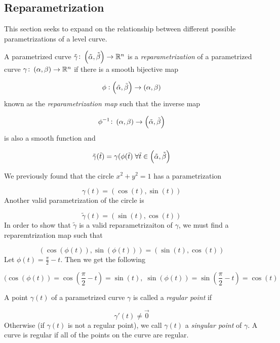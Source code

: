 \subsection{Reparametrization}
	This section seeks to expand on the relationship between different possible parametrizations of a level curve.


\begin{definition}
		A parametrized curve \(\tilde{\gamma} \colon \intoo{\tilde{\alpha}, \tilde{\beta}} \rightarrow \mathbb{R}^{n}\) is a \textit{reparametrization} of a parametrized curve \(\gamma \colon \intoo{\alpha, \beta} \rightarrow \mathbb{R}^{n}\) if there is a smooth bijective map

\[
\phi : \intoo{\tilde{\alpha}, \tilde{\beta}} \rightarrow \intoo{\alpha, \beta}
\]
		known as the \textit{reparametrization map} such that the inverse map

\[
\phi^{-1} \colon \intoo{\alpha, \beta} \rightarrow \intoo{\tilde{\alpha}, \tilde{\beta}}
\]
		is also a smooth function and

\[
\tilde{\gamma}(\tilde{t}) = \gamma(\phi(\tilde{t}) \; \forall \tilde{t} \in \intoo{\tilde{\alpha}, \tilde{\beta}}
\]

\end{definition}


\begin{example}
		We previously found that the circle \(x^{2} + y^{2} = 1\) has a parametrization

\[
\gamma(t) = (\cos(t), \sin(t))
\]
		Another valid parametrization of the circle is

\[
\tilde{\gamma}(t) = (\sin(t), \cos(t))
\]
		In order to show that \(\tilde{\gamma}\) is a valid reparametrizaiton of \(\gamma\), we must find a reparemtrization map such that

\[
(\cos(\phi(t)), \sin(\phi(t))) = (\sin(t), \cos(t))
\]
		Let \(\phi(t) = \frac{\pi}{2} - t\). Then we get the following

\[
(\cos(\phi(t)) = \cos(\frac{\pi}{2} - t) = \sin(t), \; \sin(\phi(t)) = \sin(\frac{\pi}{2} - t) = \cos(t)
\]

\end{example}


\begin{definition}
		A point \(\gamma(t)\) of a parametrized curve \(\gamma\) is called a \textit{regular point} if

\[
\gamma'(t) \not = \vec{0}
\]
		Otherwise (if \(\gamma(t)\) is not a regular point), we call \(\gamma(t)\) a \textit{singular point} of \(\gamma\).
		A curve is regular if all of the points on the curve are regular.

\end{definition}



